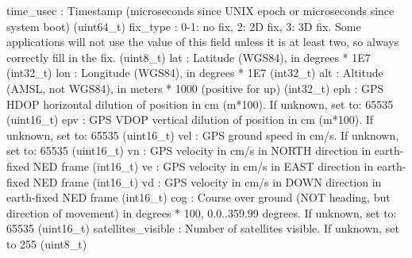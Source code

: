 \begin{DoxyVerb}
\begin{DoxyVerb}
\begin{DoxyVerb}
time_usec                 : Timestamp (microseconds since UNIX epoch or microseconds since system boot) (uint64_t)
fix_type                  : 0-1: no fix, 2: 2D fix, 3: 3D fix. Some applications will not use the value of this field unless it is at least two, so always correctly fill in the fix. (uint8_t)
lat                       : Latitude (WGS84), in degrees * 1E7 (int32_t)
lon                       : Longitude (WGS84), in degrees * 1E7 (int32_t)
alt                       : Altitude (AMSL, not WGS84), in meters * 1000 (positive for up) (int32_t)
eph                       : GPS HDOP horizontal dilution of position in cm (m*100). If unknown, set to: 65535 (uint16_t)
epv                       : GPS VDOP vertical dilution of position in cm (m*100). If unknown, set to: 65535 (uint16_t)
vel                       : GPS ground speed in cm/s. If unknown, set to: 65535 (uint16_t)
vn                        : GPS velocity in cm/s in NORTH direction in earth-fixed NED frame (int16_t)
ve                        : GPS velocity in cm/s in EAST direction in earth-fixed NED frame (int16_t)
vd                        : GPS velocity in cm/s in DOWN direction in earth-fixed NED frame (int16_t)
cog                       : Course over ground (NOT heading, but direction of movement) in degrees * 100, 0.0..359.99 degrees. If unknown, set to: 65535 (uint16_t)
satellites_visible        : Number of satellites visible. If unknown, set to 255 (uint8_t)\end{DoxyVerb}
 \mbox{\label{classpymavlink_1_1dialects_1_1v10_1_1MAVLink_af42930cacab6de2d3f8c932d2750eb72}} 

\end{DoxyVerb}
\end{DoxyVerb}
